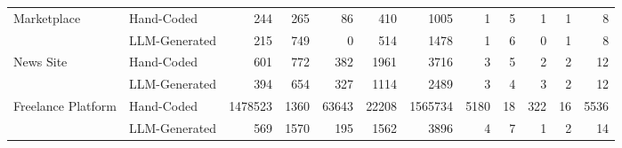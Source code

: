 \documentclass[12pt, a4paper, oneside]{report}
\begin{document}
\begin{table}[htbp]
\begin{tabular}{ll|rrrrr|rrrrr}
\multirow[t]{2}{*}{Marketplace} 
& Hand-Coded & 244 & 265 & 86 & 410 & 1005 & 1 & 5 & 1 & 1 & 8 \\
& LLM-Generated & 215 & 749 & 0 & 514 & 1478 & 1 & 6 & 0 & 1 & 8 \\
\cline{1-12}

\multirow[t]{2}{*}{News Site} 
& Hand-Coded & 601 & 772 & 382 & 1961 & 3716 & 3 & 5 & 2 & 2 & 12 \\
& LLM-Generated & 394 & 654 & 327 & 1114 & 2489 & 3 & 4 & 3 & 2 & 12 \\
\cline{1-12}

\multirow[t]{2}{*}{Freelance Platform} 
& Hand-Coded & 1478523 & 1360 & 63643 & 22208 & 1565734 & 5180 & 18 & 322 & 16 & 5536 \\
& LLM-Generated & 569 & 1570 & 195 & 1562 & 3896 & 4 & 7 & 1 & 2 & 14 \\
\cline{1-12}

\bottomrule
\end{tabular}
\end{table}
\end{document}
